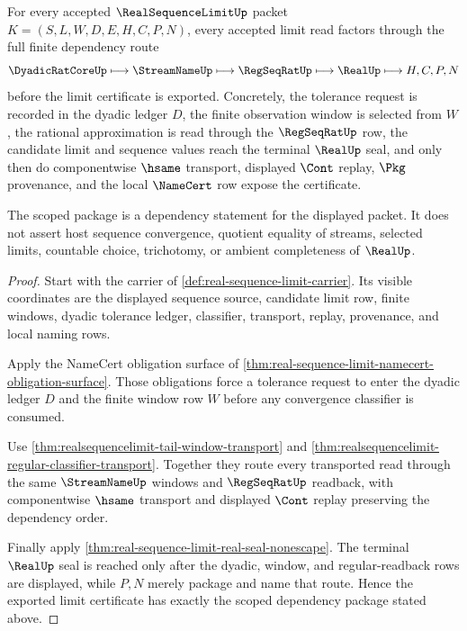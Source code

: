 \begin{theorem}\label{thm:realsequencelimit-scoped-dependency-package}
For every accepted $\RealSequenceLimitUp$ packet $K=(S,L,W,D,E,H,C,P,N)$, every accepted limit read factors through the full finite dependency route
$$
\DyadicRatCoreUp \longmapsto \StreamNameUp \longmapsto \RegSeqRatUp \longmapsto \RealUp \longmapsto H,C,P,N
$$
before the limit certificate is exported. Concretely, the tolerance request is recorded in the dyadic ledger $D$, the finite observation window is selected from $W$, the rational approximation is read through the $\RegSeqRatUp$ row, the candidate limit and sequence values reach the terminal $\RealUp$ seal, and only then do componentwise $\hsame$ transport, displayed $\Cont$ replay, $\Pkg$ provenance, and the local $\NameCert$ row expose the certificate.

The scoped package is a dependency statement for the displayed packet. It does not assert host sequence convergence, quotient equality of streams, selected limits, countable choice, trichotomy, or ambient completeness of $\RealUp$.
\end{theorem}
\begin{proof}
Start with the carrier of \autoref{def:real-sequence-limit-carrier}. Its visible coordinates are the displayed sequence source, candidate limit row, finite windows, dyadic tolerance ledger, classifier, transport, replay, provenance, and local naming rows.

Apply the NameCert obligation surface of \autoref{thm:real-sequence-limit-namecert-obligation-surface}. Those obligations force a tolerance request to enter the dyadic ledger $D$ and the finite window row $W$ before any convergence classifier is consumed.

Use \autoref{thm:realsequencelimit-tail-window-transport} and \autoref{thm:realsequencelimit-regular-classifier-transport}. Together they route every transported read through the same $\StreamNameUp$ windows and $\RegSeqRatUp$ readback, with componentwise $\hsame$ transport and displayed $\Cont$ replay preserving the dependency order.

Finally apply \autoref{thm:real-sequence-limit-real-seal-nonescape}. The terminal $\RealUp$ seal is reached only after the dyadic, window, and regular-readback rows are displayed, while $P,N$ merely package and name that route. Hence the exported limit certificate has exactly the scoped dependency package stated above.
\end{proof}

